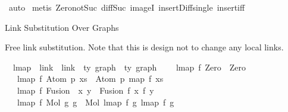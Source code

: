 \begin{isabellebody}
%
\isadelimproof
%
\endisadelimproof
%
\isatagproof
{}\isamarkupfalse%
\ auto\isanewline
{}\isamarkupfalse%
\ {\isacharparenleft}{\kern0pt}metis\ Zero{\isacharunderscore}{\kern0pt}not{\isacharunderscore}{\kern0pt}Suc\ diff{\isacharunderscore}{\kern0pt}Suc{\isacharunderscore}{\kern0pt}{}{\isacharprime}{\kern0pt}\ imageI\ insert{\isacharunderscore}{\kern0pt}Diff{\isacharunderscore}{\kern0pt}single\ insert{\isacharunderscore}{\kern0pt}iff{\isacharparenright}{\kern0pt}%
\endisatagproof
{\isafoldproof}%
%
\isadelimproof
%
\endisadelimproof
%
\isadelimdocument
%
\endisadelimdocument
%
\isatagdocument
%
\isamarkuptrue%
%
\endisatagdocument
{\isafolddocument}%
%
\isadelimdocument
%
\endisadelimdocument
%
\begin{isamarkuptext}%
Link Substitution Over Graphs%
\end{isamarkuptext}\isamarkuptrue%
%
\begin{isamarkuptext}%
Free link substitution.
Note that this is design not to change any local links.%
\end{isamarkuptext}\isamarkuptrue%
\isamarkupfalse%
\isanewline
\ \ lmap\ {\isacharcolon}{\kern0pt}{\isacharcolon}{\kern0pt}\ {\isachardoublequoteopen}{\isacharparenleft}{\kern0pt}link\ {\isacharequal}{\kern0pt}{\isachargreater}{\kern0pt}\ link{\isacharparenright}{\kern0pt}\ {\isacharequal}{\kern0pt}{\isachargreater}{\kern0pt}\ {\isacharprime}{\kern0pt}ty\ graph\ {\isacharequal}{\kern0pt}{\isachargreater}{\kern0pt}\ {\isacharprime}{\kern0pt}ty\ graph{\isachardoublequoteclose}\isanewline
{}\isanewline
\ \ \ \ {\isachardoublequoteopen}lmap\ f\ Zero\ {\isacharequal}{\kern0pt}\ Zero{\isachardoublequoteclose}\isanewline
\ {\isacharbar}{\kern0pt}\ \ {\isachardoublequoteopen}lmap\ f\ {\isacharparenleft}{\kern0pt}Atom\ p\ xs{\isacharparenright}{\kern0pt}\ {\isacharequal}{\kern0pt}\ Atom\ p\ {\isacharparenleft}{\kern0pt}map\ f\ xs{\isacharparenright}{\kern0pt}{\isachardoublequoteclose}\isanewline
\ {\isacharbar}{\kern0pt}\ \ {\isachardoublequoteopen}lmap\ f\ {\isacharparenleft}{\kern0pt}Fusion\ \ x\ y{\isacharparenright}{\kern0pt}\ {\isacharequal}{\kern0pt}\ Fusion\ {\isacharparenleft}{\kern0pt}f\ x{\isacharparenright}{\kern0pt}\ {\isacharparenleft}{\kern0pt}f\ y{\isacharparenright}{\kern0pt}{\isachardoublequoteclose}\isanewline
\ {\isacharbar}{\kern0pt}\ \ {\isachardoublequoteopen}lmap\ f\ {\isacharparenleft}{\kern0pt}Mol\ g{}\ g{}{\isacharparenright}{\kern0pt}\ {\isacharequal}{\kern0pt}\ Mol\ {\isacharparenleft}{\kern0pt}lmap\ f\ g{}{\isacharparenright}{\kern0pt}\ {\isacharparenleft}{\kern0pt}lmap\ f\ g{}{\isacharparenright}{\kern0pt}{\isachardoublequoteclose}\isanewline

\end{isabellebody}
